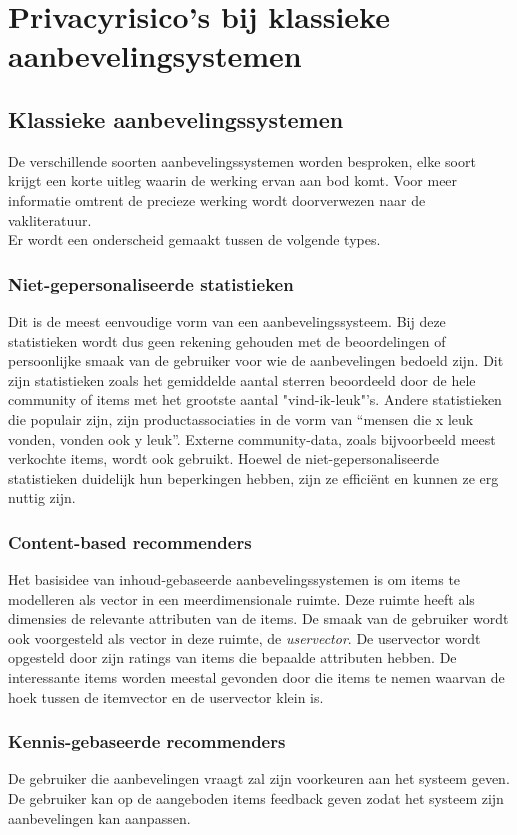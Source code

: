 \chapter{Privacyrisico's bij klassieke aanbevelingsystemen}
\label{privacyklassiek}

\section{Klassieke aanbevelingssystemen}
\label{sec:klassiek}
De verschillende soorten aanbevelingssystemen worden besproken, elke soort krijgt een korte uitleg waarin de werking ervan aan bod komt. Voor meer informatie omtrent de precieze werking wordt doorverwezen naar de vakliteratuur. \\Er wordt een onderscheid gemaakt tussen de volgende types.
\subsection{Niet-gepersonaliseerde statistieken}
Dit is de meest eenvoudige vorm van een aanbevelingssysteem. Bij deze statistieken wordt dus geen rekening gehouden met de beoordelingen of persoonlijke smaak van de gebruiker voor wie de aanbevelingen bedoeld zijn. Dit zijn statistieken zoals het gemiddelde aantal sterren beoordeeld door de hele community of items met het grootste aantal "vind-ik-leuk"'s. Andere statistieken die populair zijn, zijn productassociaties in de vorm van “mensen die x leuk vonden, vonden ook y leuk”. Externe community-data, zoals bijvoorbeeld meest verkochte items, wordt ook gebruikt.  Hoewel de niet-gepersonaliseerde statistieken duidelijk hun beperkingen hebben, zijn ze effici\"ent en kunnen ze erg nuttig zijn. 
\subsection{Content-based recommenders}
Het basisidee van inhoud-gebaseerde aanbevelingssystemen is om items te modelleren als vector in een meerdimensionale ruimte. Deze ruimte heeft als dimensies de relevante attributen van de items. De smaak van de gebruiker wordt ook voorgesteld als vector in deze ruimte, de \textit{uservector}. De uservector wordt opgesteld door zijn ratings van items die bepaalde attributen hebben. De interessante items worden meestal gevonden door die items te nemen waarvan de hoek tussen de itemvector en de uservector klein is. 
\subsection{Kennis-gebaseerde recommenders}
De gebruiker die aanbevelingen vraagt zal zijn voorkeuren aan het systeem geven. De gebruiker kan op de aangeboden items feedback geven zodat het systeem zijn aanbevelingen kan aanpassen.
